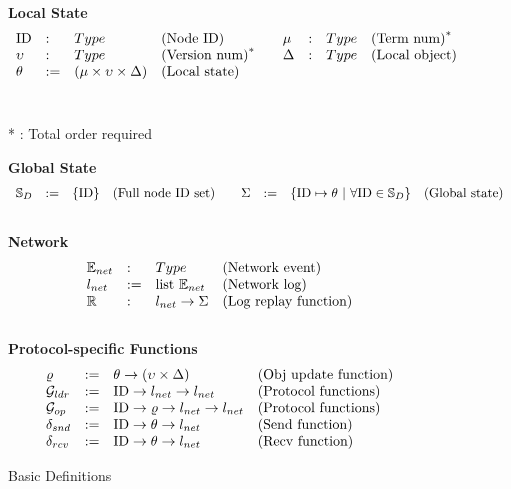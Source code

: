 \begin{figure}
\begin{small}
\raggedright

\textbf{Local State}\\
$$
\begin{array}{lllllllll}
\mathrm{ID} &:& Type & \mbox{(Node ID)} & & \mu &:& Type & \mbox{(Term num)}^* \\
\upsilon &:& Type & \mbox{(Version num)}^* & &\Delta &:& Type & \mbox{(Local object)}\\
\theta &:=& (\mu  \times \upsilon \times \Delta) & \mbox{(Local state)} & & & & & \\
\end{array}
$$
\\
\raggedleft

* : Total order required

\raggedright
\textbf{Global State}\\
$$
\begin{array}{lllllllll}
\fullset &:=& \set{\nodeid} & \mbox{(Full node ID set)} & & \gstate &:=& \set{ \nodeid \mapsto \dstate ~\vert~ \forall \nodeid \in \fullset} & \mbox{(Global state)}\\
\end{array}
$$
\\
\textbf{Network} \\
$$
\begin{array}{llll}
\packet &: & Type & \mbox{(Network event)}\\
\networklog &:=& \mbox{list}\ \packet & \mbox{(Network log)}\\
\replay &:& \networklog \rightarrow  \gstate& \mbox{(Log replay function)}\\
\end{array}
$$
\\
\textbf{Protocol-specific Functions}  \\
$$
\begin{array}{llll}
	\updatefunc & := & \dstate \rightarrow (\seqnum \times \dsvalue) &
	\mbox{(Obj update function)} \\
\gldrfunction & := & \nodeid \rightarrow \networklog \rightarrow \networklog  & \mbox{(Protocol functions)} \\
\gopfunction & := & \nodeid \rightarrow \updatefunc \rightarrow \networklog \rightarrow \networklog  & \mbox{(Protocol functions)} \\

\sendfunction & := & \nodeid \rightarrow \dstate \rightarrow \networklog & \mbox{(Send function)}\\
\recvfunction & := & \nodeid \rightarrow \dstate \rightarrow \networklog & \mbox{(Recv function)}\\
\end{array}
$$
\end{small}
\caption{Basic Definitions}
\label{fig:chapter:witnesspassing:basic-state}
\end{figure}

